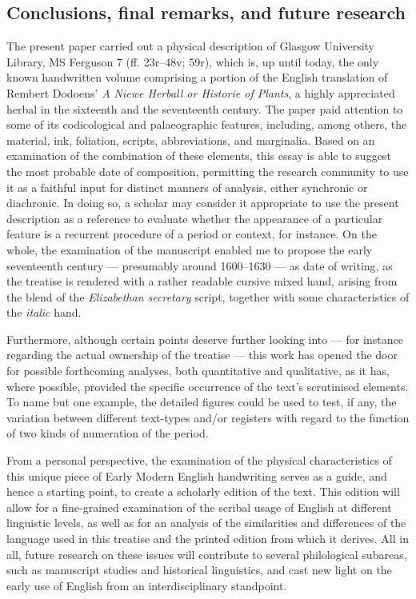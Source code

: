 \begin{paper}
\section{Conclusions, final remarks, and future research}
The present paper carried out a physical description of Glasgow
University Library, MS Ferguson 7 (ff. 23r--48v; 59r), which is, up until
today, the only known handwritten volume comprising a portion of the
English translation of Rembert Dodoens' \emph{A Niewe Herball or
Historie of Plants}, a highly appreciated herbal in the sixteenth and
the seventeenth century. The paper paid attention to some of its
codicological and palaeographic features, including, among others, the
material, ink, foliation, scripts, abbreviations, and marginalia. Based on an examination of the combination of these elements, this essay is able to suggest the most probable date of composition, permitting the research community to use it as a faithful input for distinct
manners of analysis, either synchronic or diachronic. In doing so, a
scholar may consider it appropriate to use the present description as a
reference to evaluate whether the appearance of a particular feature is
a recurrent procedure of a period or context, for instance. On the
whole, the examination of the manuscript enabled me to propose the early seventeenth century –– presumably around 1600--1630 –– as date of writing, as the treatise is
rendered with a rather readable cursive mixed hand, arising from the
blend of the \emph{Elizabethan secretary} script, together with some
characteristics of the \emph{italic} hand.

Furthermore, although certain points deserve further looking into –– for instance regarding the
actual ownership of the treatise –– this work has opened the
door for possible forthcoming analyses, both quantitative and
qualitative, as it has, where possible, provided the specific occurrence
of the text's scrutinised elements. To name but one example, the
detailed figures could be used to test, if any, the variation between different text-types and/or
registers with regard to the function of two kinds of numeration of the period.

From a personal perspective, the examination of the physical
characteristics of this unique piece of Early Modern English handwriting serves as a guide, and hence a starting point, to create a scholarly edition of the text. This
edition will allow for a fine-grained examination of the
scribal usage of English at different linguistic levels, as well as for
an analysis of the similarities and differences of the
language used in this treatise and the printed edition from which it derives.
All in all, future research on these issues will
contribute to several philological subareas, such as manuscript studies and
historical linguistics, and cast new light on the
early use of English from an interdisciplinary standpoint.



\end{paper}
